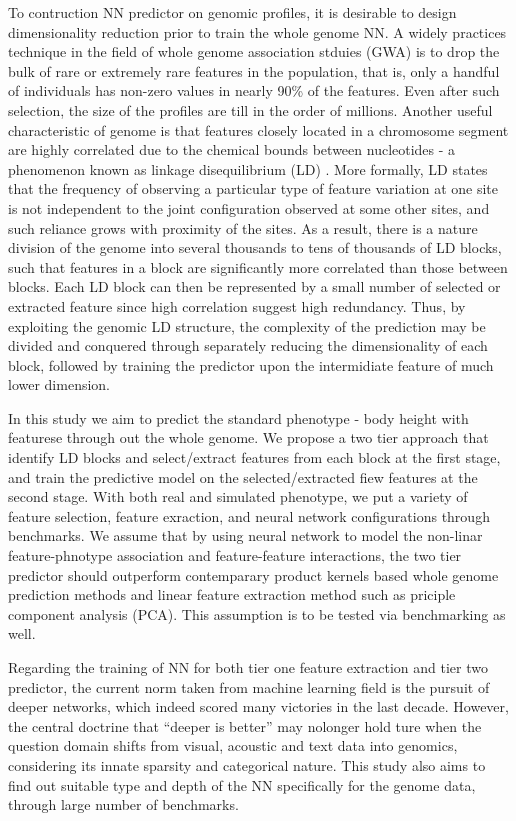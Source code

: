 \documentclass[acmtog, authorversion]{acmart}
\begin{document}
To contruction NN predictor on genomic profiles, it is desirable to design dimensionality reduction prior to train the whole genome NN. A widely practices technique in the field of whole genome association stduies (GWA) is to drop the bulk of rare or extremely rare features in the population, that is, only a handful of individuals has non-zero values in nearly 90\% of the features. Even after such selection, the size of the profiles are till in the order of millions. Another useful characteristic of genome is that features closely located in a chromosome segment are highly correlated due to the chemical bounds between nucleotides - a phenomenon known as linkage disequilibrium (LD) \cite{LD:Intro1, LD:Haploview}. More formally, LD states that the frequency of observing a particular type of feature variation at one site is not independent to the joint configuration observed at some other sites, and such reliance grows with proximity of the sites. As a result, there is a nature division of the genome into several thousands to tens of thousands of LD blocks, such that features in a block are significantly more correlated than those between blocks. Each LD block can then be represented by a small number of selected or extracted feature since high correlation suggest high redundancy. Thus, by exploiting the genomic LD structure, the complexity of the prediction may be divided and conquered through separately reducing the dimensionality of each block, followed by training the predictor upon the intermidiate feature of much lower dimension.

In this study we aim to predict the standard phenotype - body height with featurese through out the whole genome. We propose a two tier approach that identify LD blocks and select/extract features from each block at the first stage, and train the predictive model on the selected/extracted fiew features at the second stage. With both real and simulated phenotype, we put a variety of feature selection, feature exraction, and neural network configurations through benchmarks. We assume that by using neural network to model the non-linar feature-phnotype association and feature-feature interactions, the two tier predictor should outperform contemparary product kernels based whole genome prediction methods \cite{WGP:Gustavo} and linear feature extraction method such as priciple component analysis (PCA). This assumption is to be tested via benchmarking as well.

Regarding the training of NN for both tier one feature extraction and tier two predictor, the current norm taken from machine learning field is the pursuit of deeper networks, which indeed scored many victories in the last decade\cite{DL:Intro2, DL:Intro3}. However, the central doctrine that ``deeper is better'' may nolonger hold ture when the question domain shifts from visual, acoustic and text data into genomics, considering its innate sparsity and categorical nature. This study also aims to find out suitable type and depth of the NN specifically for the genome data, through large number of benchmarks.
\end{document}
